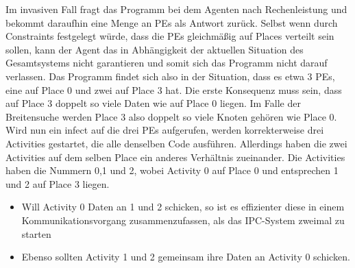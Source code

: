 Im invasiven Fall fragt das Programm bei dem Agenten nach Rechenleistung und bekommt daraufhin eine Menge an PEs als Antwort zurück. Selbst wenn durch Constraints festgelegt würde, dass die PEs gleichmäßig auf Places verteilt sein sollen, kann der Agent das in Abhängigkeit der aktuellen Situation des Gesamtsystems nicht garantieren und somit sich das Programm nicht darauf verlassen. Das Programm findet sich also in der Situation, dass es etwa 3 PEs, eine auf Place 0 und zwei auf Place 3 hat. Die erste Konsequenz muss sein, dass auf Place 3 doppelt so viele Daten wie auf Place 0 liegen. Im Falle der Breitensuche werden Place 3 also doppelt so viele Knoten gehören wie Place 0. Wird nun ein infect auf die drei PEs aufgerufen, werden korrekterweise drei Activities gestartet, die alle denselben Code ausführen. Allerdings haben die zwei Activities auf dem selben Place ein anderes Verhältnis zueinander. Die Activities haben die Nummern 0,1 und 2, wobei Activity 0 auf Place 0 und entsprechen 1 und 2 auf Place 3 liegen.
\begin{itemize}
	\item Will Activity 0 Daten an 1 und 2 schicken, so ist es effizienter diese in einem Kommunikationsvorgang zusammenzufassen, als das IPC-System zweimal zu starten
	\item Ebenso sollten Activity 1 und 2 gemeinsam ihre Daten an Activity 0 schicken.
\end{itemize}

